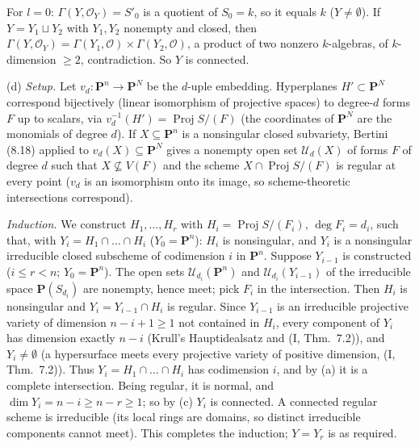 \documentclass[11pt]{article}
\begin{document}
For $l=0$: $\Gamma(Y,\mathcal O_Y)=S'_0$ is a quotient of $S_0=k$, so it equals $k$ ($Y\ne\emptyset$). If $Y=Y_1\sqcup Y_2$ with $Y_1,Y_2$ nonempty and closed, then $\Gamma(Y,\mathcal O_Y)=\Gamma(Y_1,\mathcal O)\times\Gamma(Y_2,\mathcal O)$, a product of two nonzero $k$-algebras, of $k$-dimension $\ge2$, contradiction. So $Y$ is connected.

(d) \emph{Setup.} Let $v_d:\mathbf P^n\to\mathbf P^{N}$ be the $d$-uple embedding. Hyperplanes $H'\subset\mathbf P^N$ correspond bijectively (linear isomorphism of projective spaces) to degree-$d$ forms $F$ up to scalars, via $v_d^{-1}(H')=\operatorname{Proj}S/(F)$ (the coordinates of $\mathbf P^N$ are the monomials of degree $d$). If $X\subseteq\mathbf P^n$ is a nonsingular closed subvariety, Bertini (8.18) applied to $v_d(X)\subseteq\mathbf P^N$ gives a nonempty open set $\mathcal U_d(X)$ of forms $F$ of degree $d$ such that $X\not\subseteq V(F)$ and the scheme $X\cap\operatorname{Proj}S/(F)$ is regular at every point ($v_d$ is an isomorphism onto its image, so scheme-theoretic intersections correspond).

\emph{Induction.} We construct $H_1,\dots,H_r$ with $H_i=\operatorname{Proj}S/(F_i)$, $\deg F_i=d_i$, such that, with $Y_i=H_1\cap\dots\cap H_i$ ($Y_0=\mathbf P^n$): $H_i$ is nonsingular, and $Y_i$ is a nonsingular irreducible closed subscheme of codimension $i$ in $\mathbf P^n$. Suppose $Y_{i-1}$ is constructed ($i\le r<n$; $Y_0=\mathbf P^n$). The open sets $\mathcal U_{d_i}(\mathbf P^n)$ and $\mathcal U_{d_i}(Y_{i-1})$ of the irreducible space $\mathbf P(S_{d_i})$ are nonempty, hence meet; pick $F_i$ in the intersection. Then $H_i$ is nonsingular and $Y_i=Y_{i-1}\cap H_i$ is regular. Since $Y_{i-1}$ is an irreducible projective variety of dimension $n-i+1\ge1$ not contained in $H_i$, every component of $Y_i$ has dimension exactly $n-i$ (Krull's Hauptidealsatz and (I, Thm.~7.2)), and $Y_i\ne\emptyset$ (a hypersurface meets every projective variety of positive dimension, (I, Thm.~7.2)). Thus $Y_i=H_1\cap\dots\cap H_i$ has codimension $i$, and by (a) it is a complete intersection. Being regular, it is normal, and $\dim Y_i=n-i\ge n-r\ge1$; so by (c) $Y_i$ is connected. A connected regular scheme is irreducible (its local rings are domains, so distinct irreducible components cannot meet). This completes the induction; $Y=Y_r$ is as required.
\end{document}
